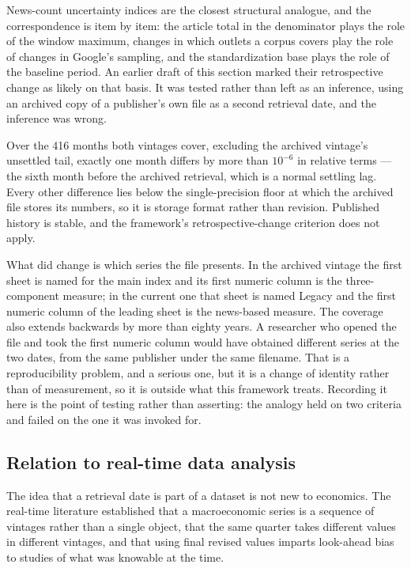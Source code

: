\documentclass[12pt,a4paper,oneside]{article}
\begin{document}
News-count uncertainty indices are the closest structural analogue, and the
correspondence is item by item: the article total in the denominator plays the
role of the window maximum, changes in which outlets a corpus covers play the role
of changes in Google's sampling, and the standardization base plays the role of
the baseline period. An earlier draft of this section marked their retrospective
change as likely on that basis. It was tested rather than left as an inference,
using an archived copy of a publisher's own file as a second retrieval date, and
the inference was wrong.

Over the 416 months both vintages cover, excluding the archived vintage's
unsettled tail, exactly one month differs by more than $10^{-6}$ in relative terms
--- the sixth month before the archived retrieval, which is a normal settling lag.
Every other difference lies below the single-precision floor at which the archived
file stores its numbers, so it is storage format rather than revision. Published
history is stable, and the framework's retrospective-change criterion does not
apply.

What did change is which series the file presents. In the archived vintage the
first sheet is named for the main index and its first numeric column is the
three-component measure; in the current one that sheet is named Legacy and the
first numeric column of the leading sheet is the news-based measure. The coverage
also extends backwards by more than eighty years. A researcher who opened the file
and took the first numeric column would have obtained different series at the two
dates, from the same publisher under the same filename. That is a reproducibility
problem, and a serious one, but it is a change of identity rather than of
measurement, so it is outside what this framework treats. Recording it here is the
point of testing rather than asserting: the analogy held on two criteria and
failed on the one it was invoked for.

\subsection{Relation to real-time data analysis}\label{sec:realtimedata}

The idea that a retrieval date is part of a dataset is not new to economics. The
real-time literature \citep{CroushoreStark2001} established that a macroeconomic
series is a sequence of vintages rather than a single object, that the same
quarter takes different values in different vintages, and that using final revised
values imparts look-ahead bias to studies of what was knowable at the time.
\end{document}

